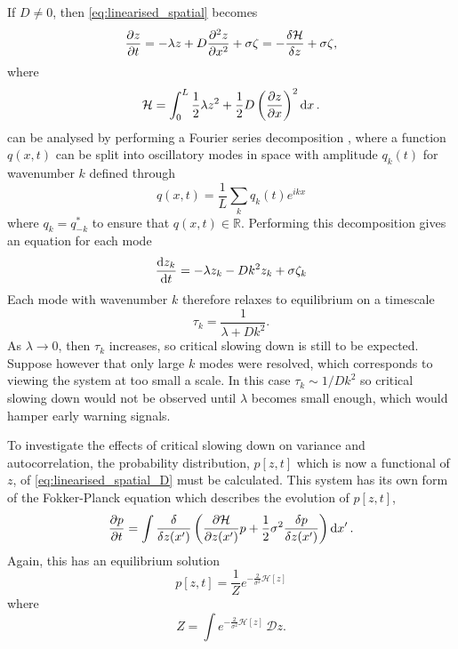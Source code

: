 If $D \neq 0$, then \cref{eq:linearised_spatial} becomes
\begin{equation}
  \label{eq:linearised_spatial_D}
  \pdv{z}{t} = -\lambda z + D \pdv[2]{z}{x} + \sigma\zeta = -\fdv{\mathcal{H}}{z} + \sigma \zeta,
\end{equation}
where
\begin{equation}
  \label{eq:linearised_energy}
  \mathcal{H} = \int_0^L \frac{1}{2}\lambda z^2 + \frac{1}{2}D\left(\pdv{z}{x}\right)^2 \dd{x}.
\end{equation}
 can be analysed by performing a Fourier series decomposition \parencite{riley2006}, where a function $q(x,t)$ can be split
into oscillatory modes in space with amplitude $q_k(t)$ for wavenumber $k$ defined through
\begin{equation}
  \label{eq:fourier}
  q(x,t) = \frac{1}{L} \sum_k q_k(t) e^{ikx}
\end{equation}
where $q_k = q_{-k}^*$ to ensure that $q(x,t) \in \mathbb{R}$.
Performing this decomposition gives an equation for each mode
\begin{equation}
  \label{eq:linearised_spatial_D_modes}
  \dv{z_k}{t} = -\lambda z_k - Dk^2 z_k + \sigma \zeta_k
\end{equation}
Each mode with wavenumber $k$ therefore relaxes to equilibrium on a timescale
\begin{equation}
  \label{eq:equilirium_timescale}
  \tau_k = \frac{1}{\lambda + Dk^2}.
\end{equation}
As $\lambda \rightarrow 0$, then $\tau_k$ increases, so critical slowing down is still to be expected. Suppose however that only large $k$ modes were resolved, which corresponds to
viewing the system at too small a scale. In this case $\tau_k \sim 1/Dk^2$ so critical slowing down would not be observed until $\lambda$ becomes small enough, which would hamper early
warning signals.

To investigate the effects of critical slowing down on variance and autocorrelation, the probability distribution, $p[z,t]$ which is now a functional of $z$,
of \cref{eq:linearised_spatial_D} must be calculated. This system has its own
form of the Fokker-Planck equation \parencite{Goldenfeld1992} which describes the evolution of $p[z,t]$,
\begin{equation}
  \label{eq:fokker_planck_functional}
  \pdv{p}{t} = \int \fdv{z(x')} \left( \pdv{\mathcal{H}}{z(x')} p + \frac{1}{2}\sigma^2 \fdv{p}{z(x')}\right) \dd{x'}.
\end{equation}
Again, this has an equilibrium solution
\begin{equation}
  \label{eq:fokker_planck_functional_equilibrium}
  p[z,t] = \frac{1}{Z} e^{-\frac{2}{\sigma^2} \mathcal{H}[z]}
\end{equation}
where
\begin{equation}
  \label{eq:partition_functional}
  Z = \int e^{-\frac{2}{\sigma^2} \mathcal{H}[z]}\,\mathcal{D}z.
\end{equation}

